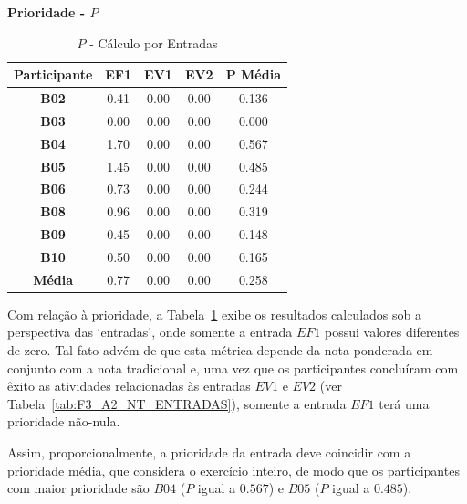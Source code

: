 \textbf{Prioridade - $P$}

\begin{table}[htbp]
	\centering
	\caption{$P$ - Cálculo por Entradas}
	\begin{tabular}{|c|c|c|c|c|}
		\hline
		\rowcolor[HTML]{D0CECE} 
		\textbf{Participante} & \textbf{EF1} & \textbf{EV1} & \textbf{EV2} & \textbf{P Média} \\ \hline
		\textbf{B02}          & 0.41         & 0.00         & 0.00         & 0.136            \\ \hline
		\rowcolor[HTML]{F2F2F2} 
		\textbf{B03}          & 0.00         & 0.00         & 0.00         & 0.000            \\ \hline
		\textbf{B04}          & 1.70         & 0.00         & 0.00         & 0.567            \\ \hline
		\rowcolor[HTML]{F2F2F2} 
		\textbf{B05}          & 1.45         & 0.00         & 0.00         & 0.485            \\ \hline
		\textbf{B06}          & 0.73         & 0.00         & 0.00         & 0.244            \\ \hline
		\rowcolor[HTML]{F2F2F2} 
		\textbf{B08}          & 0.96         & 0.00         & 0.00         & 0.319            \\ \hline
		\textbf{B09}          & 0.45         & 0.00         & 0.00         & 0.148            \\ \hline
		\rowcolor[HTML]{F2F2F2} 
		\textbf{B10}          & 0.50         & 0.00         & 0.00         & 0.165            \\ \hline
		\rowcolor[HTML]{D0CECE} 
		\textbf{Média}        & 0.77         & 0.00         & 0.00         & 0.258            \\ \hline
	\end{tabular}
	\label{tab:F3_A2_P_ENTRADAS}
\end{table}

Com relação à prioridade, a Tabela~\ref{tab:F3_A2_P_ENTRADAS} exibe os resultados calculados sob a perspectiva das `entradas', onde somente a entrada $EF1$ possui valores diferentes de zero. Tal fato advém de que esta métrica depende da nota ponderada em conjunto com a nota tradicional e, uma vez que os participantes concluíram com êxito as atividades relacionadas às entradas $EV1$ e $EV2$ (ver Tabela~\ref{tab:F3_A2_NT_ENTRADAS}), somente a entrada $EF1$ terá uma prioridade não-nula.

Assim, proporcionalmente, a prioridade da entrada deve coincidir com a prioridade média, que considera o exercício inteiro, de modo que os participantes com maior prioridade são $B04$ ($P$ igual a $0.567$) e $B05$ ($P$ igual a $0.485$).


